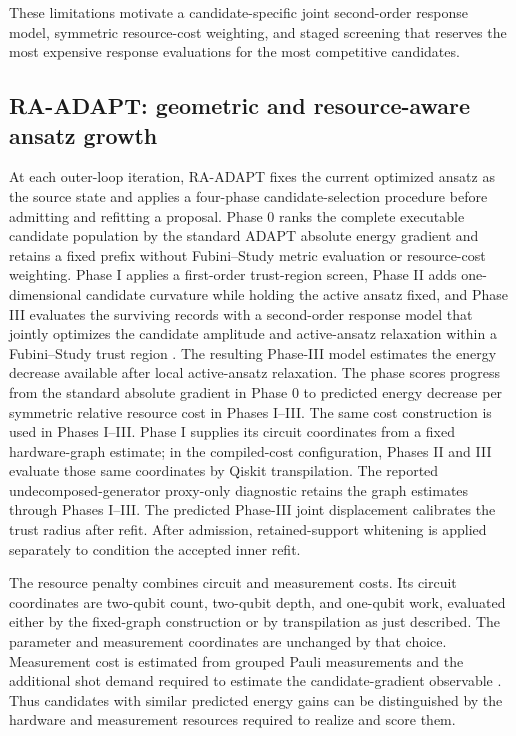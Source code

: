 \documentclass[
  reprint,
  amsmath,
  amssymb,
  aps,
  pra,
  nofootinbib,
  superscriptaddress,
  floatfix
]{revtex4-2}
\begin{document}
These limitations motivate a candidate-specific joint second-order response model, symmetric resource-cost weighting, and staged screening that reserves the most expensive response evaluations for the most competitive candidates.




%
\subsection{\textsc{RA-ADAPT}: geometric and resource-aware ansatz growth}
At each outer-loop iteration, \textsc{RA-ADAPT} fixes the current optimized
ansatz as the source state and applies a four-phase candidate-selection
procedure before admitting and refitting a proposal. Phase 0 ranks the complete
executable candidate population by the standard ADAPT absolute energy
gradient and retains a fixed prefix without Fubini--Study metric evaluation or
resource-cost weighting. Phase I applies a first-order trust-region screen,
Phase II adds one-dimensional candidate curvature while holding the active
ansatz fixed, and Phase III evaluates the surviving records with a
second-order response model that jointly optimizes the candidate amplitude and
active-ansatz relaxation within a Fubini--Study trust region
\cite{Nocedal2006TrustRegion,ProvostVallee1980,Stokes2020QNG,Haug2021Capacity,VanStraaten2021MeasurementCost}.
The resulting Phase-III model estimates the energy decrease available after
local active-ansatz relaxation. The phase scores progress from the standard
absolute gradient in Phase 0 to predicted energy decrease per symmetric
relative resource cost in Phases I--III. The same cost construction is used
in Phases I--III. Phase I supplies its circuit coordinates from a
fixed hardware-graph estimate; in the compiled-cost configuration, Phases II
and III evaluate those same coordinates by Qiskit transpilation. The reported
undecomposed-generator proxy-only diagnostic retains the graph estimates
through Phases I--III.
The predicted Phase-III joint displacement calibrates the trust radius after
refit. After admission,
retained-support whitening is applied separately to condition the accepted
inner refit.

The resource penalty combines circuit and measurement costs. Its circuit
coordinates are two-qubit count, two-qubit depth, and one-qubit work, evaluated
either by the fixed-graph construction or by transpilation as just described.
The parameter and measurement coordinates are unchanged by that choice.
Measurement cost is estimated from grouped Pauli measurements and the
additional shot demand required to estimate the candidate-gradient observable
\cite{Verteletskyi2020CliqueCover,Yen2020CompatibleMeasurements,Ikhtiarudin2025ShotEfficient}.
Thus candidates with similar predicted energy gains can be distinguished by
the hardware and measurement resources required to realize and score them.
\end{document}
